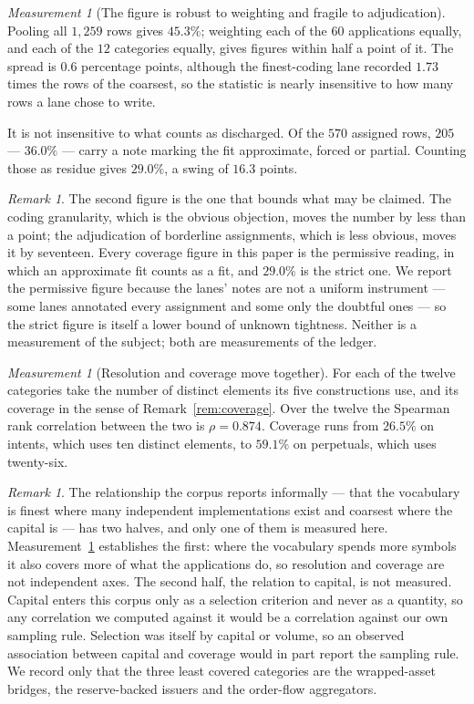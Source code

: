 \documentclass[11pt,reqno]{amsart}
\theoremstyle{plain}
\theoremstyle{definition}
\theoremstyle{remark}
\newtheorem{measurement}[theorem]{Measurement}
\newtheorem{remark}[theorem]{Remark}
\begin{document}
\begin{measurement}[The figure is robust to weighting and fragile to
adjudication]\label{meas:covsens}
Pooling all $1{,}259$ rows gives $45.3\%$; weighting each of the $60$
applications equally{,} and each of the $12$ categories equally{,} gives figures
within half a point of it. The spread is $0.6$ percentage points, although the
finest-coding lane recorded $1.73$ times the rows of the coarsest, so the
statistic is nearly insensitive to how many rows a lane chose to write.

It is not insensitive to what counts as discharged. Of the $570$
assigned rows, $205$ --- $36.0\%$ --- carry a note
marking the fit approximate, forced or partial. Counting those as residue gives
$29.0\%$, a swing of $16.3$ points.
\end{measurement}

\begin{remark}
The second figure is the one that bounds what may be claimed. The coding
granularity, which is the obvious objection, moves the number by less than a
point; the adjudication of borderline assignments, which is less obvious, moves
it by seventeen. Every coverage figure in this paper is the permissive reading,
in which an approximate fit counts as a fit, and $29.0\%$ is the strict one. We
report the permissive figure because the lanes' notes are not a uniform
instrument --- some lanes annotated every assignment and some only the doubtful
ones --- so the strict figure is itself a lower bound of unknown tightness.
Neither is a measurement of the subject; both are measurements of the ledger.
\end{remark}

\begin{measurement}[Resolution and coverage move together]\label{meas:rho}
For each of the twelve categories take the number of distinct elements its five
constructions use, and its coverage in the sense of
Remark~\ref{rem:coverage}. Over the twelve the Spearman rank correlation between
the two is $\rho = 0.874$. Coverage runs from $26.5\%$ on intents, which uses
ten distinct elements, to $59.1\%$ on perpetuals, which uses twenty-six.
\end{measurement}

\begin{remark}
The relationship the corpus reports informally --- that the vocabulary is finest
where many independent implementations exist and coarsest where the capital is
--- has two halves, and only one of them is measured here.
Measurement~\ref{meas:rho} establishes the first: where the vocabulary spends
more symbols it also covers more of what the applications do, so resolution and
coverage are not independent axes. The second half, the relation to capital, is
not measured. Capital enters this corpus only as a selection criterion and never
as a quantity, so any correlation we computed against it would be a correlation
against our own sampling rule. Selection was itself by capital or volume, so an observed association between
capital and coverage would in part report the sampling rule. We record only that
the three least covered categories are the wrapped-asset bridges, the
reserve-backed issuers and the order-flow aggregators.
\end{remark}
\end{document}

